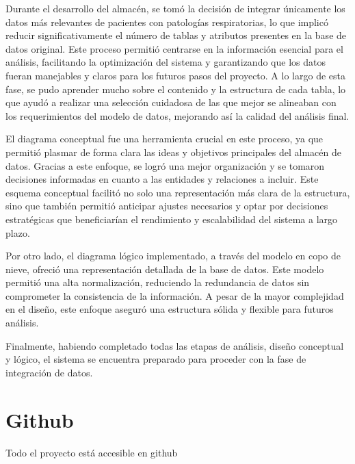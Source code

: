 \documentclass[12pt, a4paper, twoside]{article}
\begin{document}
	Durante el desarrollo del almacén, se tomó la decisión de integrar únicamente los datos más relevantes de pacientes con patologías respiratorias, lo que implicó reducir significativamente el número de tablas y atributos presentes en la base de datos original. Este proceso permitió centrarse en la información esencial para el análisis, facilitando la optimización del sistema y garantizando que los datos fueran manejables y claros para los futuros pasos del proyecto. A lo largo de esta fase, se pudo aprender mucho sobre el contenido y la estructura de cada tabla, lo que ayudó a realizar una selección cuidadosa de las que mejor se alineaban con los requerimientos del modelo de datos, mejorando así la calidad del análisis final.
	
	El diagrama conceptual fue una herramienta crucial en este proceso, ya que permitió plasmar de forma clara las ideas y objetivos principales del almacén de datos. Gracias a este enfoque, se logró una mejor organización y se tomaron decisiones informadas en cuanto a las entidades y relaciones a incluir. Este esquema conceptual facilitó no solo una representación más clara de la estructura, sino que también permitió anticipar ajustes necesarios y optar por decisiones estratégicas que beneficiarían el rendimiento y escalabilidad del sistema a largo plazo.
	
	Por otro lado, el diagrama lógico implementado, a través del modelo en copo de nieve, ofreció una representación detallada de la base de datos. Este modelo permitió una alta normalización, reduciendo la redundancia de datos sin comprometer la consistencia de la información. A pesar de la mayor complejidad en el diseño, este enfoque aseguró una estructura sólida y flexible para futuros análisis.
	
	Finalmente, habiendo completado todas las etapas de análisis, diseño conceptual y lógico, el sistema se encuentra preparado para proceder con la fase de integración de datos. 
	


	\section{Github}

	Todo el proyecto está accesible en github \cite{depab2024}
	\printbibliography
	
	
	
	
\end{document}
